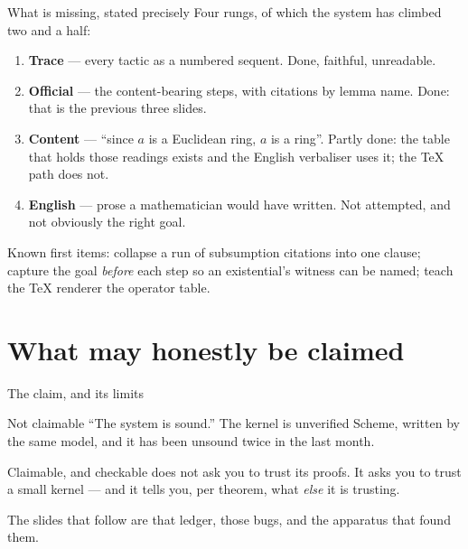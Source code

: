 \documentclass[11pt,aspectratio=169]{beamer}
\begin{document}
\begin{frame}{What is missing, stated precisely}
  Four rungs, of which the system has climbed two and a half:
  \begin{enumerate}
    \item \textbf{Trace} --- every tactic as a numbered sequent. Done, faithful,
          unreadable.
    \item \textbf{Official} --- the content-bearing steps, with citations by
          lemma name. Done: that is the previous three slides.
    \item \textbf{Content} --- ``since $a$ is a Euclidean ring, $a$ is a
          ring''. Partly done: the table that holds those readings exists and
          the English verbaliser uses it; the \TeX{} path does not.
    \item \textbf{English} --- prose a mathematician would have written.
          Not attempted, and not obviously the right goal.
  \end{enumerate}
  \vfill
  \small Known first items: collapse a run of subsumption citations into one
  clause; capture the goal \emph{before} each step so an existential's witness
  can be named; teach the \TeX{} renderer the operator table.
\end{frame}

\section{What may honestly be claimed}

\begin{frame}{The claim, and its limits}
  \begin{block}{Not claimable}
    ``The system is sound.'' The kernel is unverified Scheme, written by the
    same model, and it has been unsound twice in the last month.
  \end{block}
  \begin{block}{Claimable, and checkable}
    \vnb{} does not ask you to trust its proofs. It asks you to trust a small
    kernel --- and it tells you, per theorem, what \emph{else} it is trusting.
  \end{block}
  \vfill
  The slides that follow are that ledger, those bugs, and the apparatus that
  found them.
\end{frame}
\end{document}
